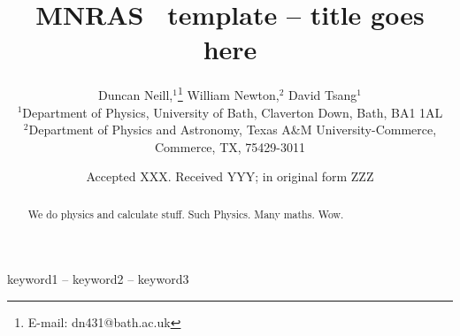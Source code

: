 \documentclass[fleqn,usenatbib]{mnras}
\title[Short title, max. 45 characters]{MNRAS \LaTeXe\ template -- title goes here}
\author[D. Neill et al.]{
Duncan Neill,$^{1}$\thanks{E-mail: dn431@bath.ac.uk}
William Newton,$^{2}$
David Tsang$^{1}$
\\
$^{1}$Department of Physics, University of Bath, Claverton Down, Bath, BA1 1AL\\
$^{2}$Department of Physics and Astronomy, Texas A\&M University-Commerce, Commerce, TX, 75429-3011
}
\date{Accepted XXX. Received YYY; in original form ZZZ}
\begin{document}
\label{firstpage}
\pagerange{\pageref{firstpage}--\pageref{lastpage}}
\maketitle

\begin{abstract}
We do physics and calculate stuff. 
Such Physics. Many maths. Wow.
\end{abstract}

\begin{keywords}
keyword1 -- keyword2 -- keyword3
\end{keywords}









\end{document}
